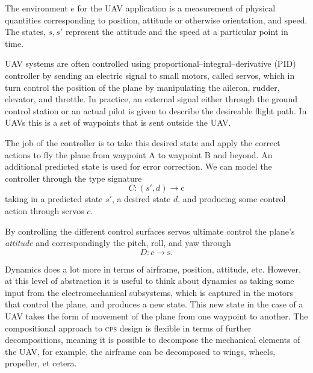 \documentclass{article}
\begin{document}
The environment \(e\) for the UAV application is a measurement
of physical quantities corresponding to position, attitude
or otherwise orientation, and speed.
The states, \(s, s'\) represent the attitude
and the speed at a particular point in time.

UAV systems are often controlled
using proportional--integral--derivative (PID) controller
by sending an electric signal to small motors, called servos,
which in turn control the position of the plane
by manipulating the aileron, rudder, elevator, and throttle.
In practice, an external signal
either through the ground control station
or an actual pilot is given to describe the desireable flight path.
In UAVs this is a set of waypoints that is sent outside the UAV.

The job of the controller is to take this desired state
and apply the correct actions to fly the plane from waypoint A
to waypoint B and beyond. An additional predicted state is used for error correction.
We can model the controller
through the type signature \[{C}: (s', d) \rightarrow \text{c}\] taking
in a predicted state $s'$, a desired state $d$,
and producing some control action through servos $c$.

By controlling the different control surfaces servos ultimate control the plane's \emph{attitude}
and correspondingly the pitch, roll, and yaw through \[{D}: c \rightarrow \text{s.}\]

Dynamics does a lot more in terms of airframe, position, attitude, etc.
However, at this level of abstraction it is useful
to think about dynamics as taking some input
from the electromechanical subsystems,
which is captured in the motors that control the plane,
and produces a new state.
This new state in the case of a UAV takes the form
of movement of the plane from one waypoint to another.
The compositional approach to \textsc{cps} design is flexible
in terms of further decompositions, meaning it is possible
to decompose the mechanical elements of the UAV,
for example, the airframe can be decomposed to wings, wheels, propeller, et cetera.



\end{document}
